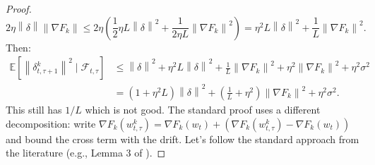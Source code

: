 \documentclass{article}
\newcommand{\norm}[1]{\left\| #1 \right\|}
\begin{document}
\begin{proof}
\begin{equation}
    2\eta \norm{\delta} \norm{\nabla F_k} \le 2\eta \left( \frac{1}{2} \eta L \norm{\delta}^2 + \frac{1}{2\eta L} \norm{\nabla F_k}^2 \right) = \eta^2 L \norm{\delta}^2 + \frac{1}{L} \norm{\nabla F_k}^2.
\end{equation}
Then:
\begin{align}
\mathbb{E}[\norm{\delta_{t,\tau+1}^k}^2 \mid \mathcal{F}_{t,\tau}]
&\le \norm{\delta}^2 + \eta^2 L \norm{\delta}^2 + \frac{1}{L} \norm{\nabla F_k}^2 + \eta^2 \norm{\nabla F_k}^2 + \eta^2 \sigma^2 \\
&= (1 + \eta^2 L) \norm{\delta}^2 + \left( \frac{1}{L} + \eta^2 \right) \norm{\nabla F_k}^2 + \eta^2 \sigma^2.
\end{align}
This still has $1/L$ which is not good. The standard proof uses a different decomposition: write $\nabla F_k(w_{t,\tau}^k) = \nabla F_k(w_t) + (\nabla F_k(w_{t,\tau}^k) - \nabla F_k(w_t))$ and bound the cross term with the drift. Let's follow the standard approach from the literature (e.g., Lemma 3 of \cite{li2020federated}).


\end{proof}
\end{document}
